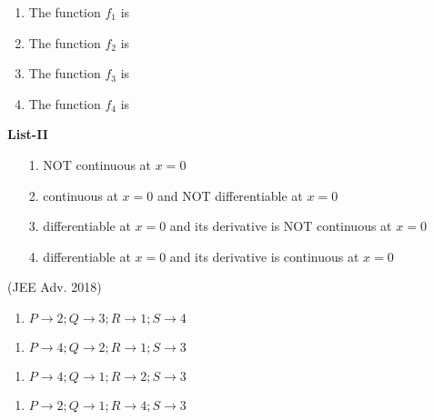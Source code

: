 \documentclass[journal,12pt,twocolumn]{IEEEtran}
\theoremstyle{remark}
\begin{document}
\begin{enumerate}
\begin{multicols}{2}
				\begin{enumerate}[label=\Alph*., start=16]
					\item The function $f_1$ is
					\item The function $f_2$ is 
					\item The function $f_3$ is 
					\item The function $f_4$ is
				\end{enumerate}
				\columnbreak
				\textbf{List-II}
				\begin{enumerate}
					\item[1.]  NOT continuous at $x = 0$ 
					\item[2.]  continuous at $x = 0$ and NOT differentiable at $x = 0$
					\item[3.] differentiable at $x = 0$ and its derivative is NOT continuous at $x = 0$
					\item[4.] differentiable at $x = 0$ and its derivative is continuous at $x = 0$
				\end{enumerate}
                 \hfill(JEE Adv. 2018)
		\end{multicols}
            \begin{multicols}{2}
			\begin{enumerate}
				\item $P\rightarrow2;Q\rightarrow3;R\rightarrow1;S\rightarrow4$
			\end{enumerate}
			\begin{enumerate}
				\item $P\rightarrow4;Q\rightarrow2;R\rightarrow1;S\rightarrow3$
			\end{enumerate}
			\columnbreak
			\begin{enumerate}
				\item $P\rightarrow4;Q\rightarrow1;R\rightarrow2;S\rightarrow3$
			\end{enumerate}
			\begin{enumerate}
				\item $P\rightarrow2;Q\rightarrow1;R\rightarrow4;S\rightarrow3$
			\end{enumerate}
		\end{multicols}
\end{enumerate}
\twocolumn
\end{document}
